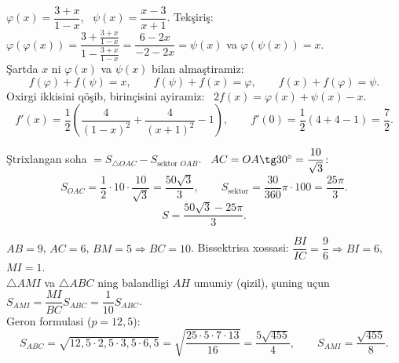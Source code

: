 $\varphi(x)=\dfrac{3+x}{1-x}$, \ $\psi(x)=\dfrac{x-3}{x+1}$. Tekşiriş: $\varphi(\varphi(x))=\dfrac{3+\frac{3+x}{1-x}}{1-\frac{3+x}{1-x}}=\dfrac{6-2x}{-2-2x}=\psi(x)$ va $\varphi(\psi(x))=x$.\\
Şartda $x$ ni $\varphi(x)$ va $\psi(x)$ bilan almaştiramiz:
\[f(\varphi)+f(\psi)=x,\qquad f(\psi)+f(x)=\varphi,\qquad f(x)+f(\varphi)=\psi.\]
Oxirgi ikkisini qöşib, birinçisini ayiramiz: \ $2f(x)=\varphi(x)+\psi(x)-x$.
\[f'(x)=\frac12\left(\frac4{(1-x)^2}+\frac4{(x+1)^2}-1\right),\qquad f'(0)=\frac12(4+4-1)=\frac72.\]

Ştrixlangan soha $=S_{\triangle OAC}-S_{\text{sektor }OAB}$. \ $AC=OA\tg30^\circ=\dfrac{10}{\sqrt3}$:
\[S_{OAC}=\frac12\cdot10\cdot\frac{10}{\sqrt3}=\frac{50\sqrt3}3,\qquad S_{\text{sektor}}=\frac{30}{360}\pi\cdot100=\frac{25\pi}3.\]
\[S=\frac{50\sqrt3-25\pi}3.\]

$AB=9$, $AC=6$, $BM=5\Rightarrow BC=10$. Bissektrisa xossasi: $\dfrac{BI}{IC}=\dfrac96\Rightarrow BI=6$, \ $MI=1$.\\
$\triangle AMI$ va $\triangle ABC$ ning balandligi $AH$ umumiy (\textcolor{aux}{qizil}), şuning uçun $S_{AMI}=\dfrac{MI}{BC}S_{ABC}=\dfrac1{10}S_{ABC}$.\\
Geron formulasi ($p=12{,}5$):
\[S_{ABC}=\sqrt{12{,}5\cdot2{,}5\cdot3{,}5\cdot6{,}5}=\sqrt{\frac{25\cdot5\cdot7\cdot13}{16}}=\frac{5\sqrt{455}}4,\qquad S_{AMI}=\frac{\sqrt{455}}8.\]

